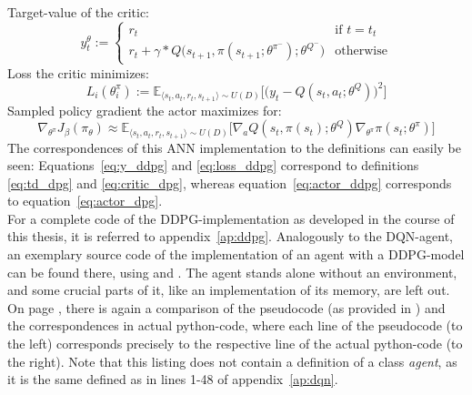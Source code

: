 \noindent Target-value of the critic:
\begin{equation} \label{eq:y_ddpg}
	y_t^\theta := \begin{cases} 
	r_t & \text{if } t = t_t\\
	r_t + \gamma * Q\big(s_{t+1}, \pi(s_{t+1};\theta^{\pi^-});\theta^{Q^-} \big)  & \text{otherwise} 
	\end{cases} %
\end{equation}
\noindent Loss the critic minimizes:
\begin{equation} \label{eq:loss_ddpg}
	L_i(\theta^\pi_i) := \mathds{E}_{\langle s_t,a_t,r_t,s_{t+1} \rangle \sim U(D)} \Big[\Big( y_t - Q(s_t,a_t;\theta^Q) \Big)^2\Big]
\end{equation}
\noindent Sampled policy gradient the actor maximizes for:
\begin{equation} \label{eq:actor_ddpg}
	\nabla_{\theta^\pi}J_\beta(\pi_\theta) \approx \mathds{E}_{\langle s_t,a_t,r_t,s_{t+1} \rangle \sim U(D)} \Big[ \nabla_a Q(s_t,\pi(s_t);\theta^Q) \nabla_{\theta^\pi} \pi(s_t;\theta^\pi) \Big]
\end{equation}
The correspondences of this ANN implementation to the definitions can easily be seen: Equations~\ref{eq:y_ddpg} and \ref{eq:loss_ddpg} correspond to definitions \ref{eq:td_dpg} and \ref{eq:critic_dpg}, whereas equation~\ref{eq:actor_ddpg} corresponds to equation~\ref{eq:actor_dpg}.\\

For a complete code of the DDPG-implementation as developed in the course of this thesis, it is referred to appendix~\ref{ap:ddpg}. Analogously to the DQN-agent, an exemplary source code of the implementation of an agent with a DDPG-model can be found there, using  and . The agent stands alone without an environment, and some crucial parts of it, like an implementation of its memory, are left out. On page \pageref{ap:ddpg_comparison}, there is again a comparison of the pseudocode (as provided in \cite{lillicrap_continuous_2015}) and the correspondences in actual python-code, where each line of the pseudocode (to the left) corresponds precisely to the respective line of the actual python-code (to the right). Note that this listing does not contain a definition of a class \textit{agent}, as it is the same defined as in lines 1-48 of appendix~\ref{ap:dqn}.



